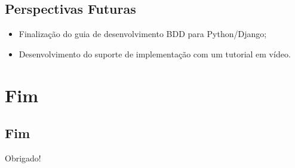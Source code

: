 \documentclass{beamer}
\begin{document}
\subsection{Perspectivas Futuras}
\begin{frame}
  \begin{itemize}
      \item Finalização do guia de desenvolvimento BDD para Python/Django;
      \item Desenvolvimento do suporte de implementação com um tutorial em vídeo.
  \end{itemize}
\end{frame}



\section{Fim}
\subsection{Fim}
\begin{frame}
\Huge{\centerline{Obrigado!}}
\end{frame}

\end{document}
